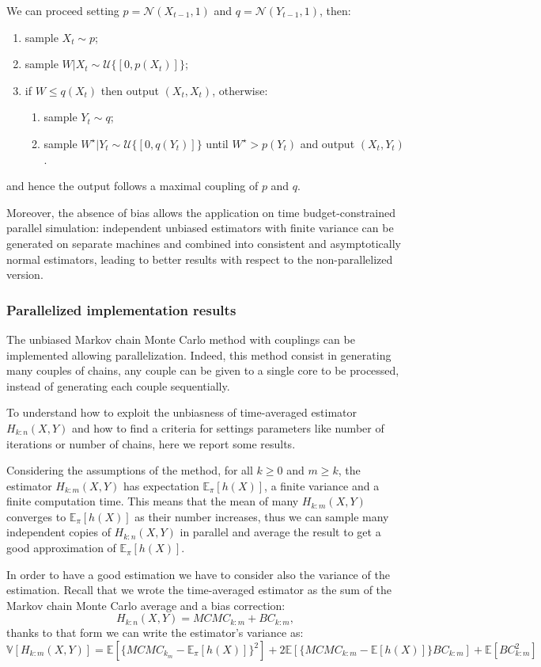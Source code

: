 \documentclass {article}
\begin{document}
We can proceed setting $p = \mathcal{N}(X_{t-1},1)$ and $q = \mathcal{N}(Y_{t-1},1)$, then:
\begin{enumerate}
	\item sample $X_t \sim p$;
	\item sample $W|X_t \sim \mathcal{U}\{[0,p(X_t)]\}$;
	\item if $W\leq q(X_t)$ then output $(X_t,X_t)$, otherwise:
	\begin{enumerate}
		\item sample $Y_t \sim q$;
		\item sample $W^\star | Y_t \sim \mathcal{U}\{[0, q(Y_t)]\}$ 
		until $W^\star > p(Y_t)$ and output $(X_t,Y_t)$.
	\end{enumerate}
\end{enumerate}
and hence the output follows a maximal coupling of $p$ and $q$.

Moreover, the absence of bias allows the application on time budget-constrained parallel simulation: independent unbiased estimators with finite variance can be generated on separate machines and combined into consistent and asymptotically normal estimators, leading to better results with respect to the non-parallelized version.

\subsubsection{Parallelized implementation results}
The unbiased Markov chain Monte Carlo method with couplings can be implemented allowing parallelization. Indeed, this method consist in generating many couples of chains, any couple can be given to a single core to be processed, instead of generating each couple sequentially.

To understand how to exploit the unbiasness of time-averaged estimator $H_{k:n}(X,Y)$ and how to find a criteria for settings parameters like number of iterations or number of chains, here we report some results.

Considering the assumptions of the method, for all $k\geq 0$ and $m \geq k$, the estimator $H_{k:m}(X,Y)$ has expectation $\mathbb{E}_\pi[h(X)]$, a finite variance and a finite computation time. This means that the mean of many $H_{k:m}(X,Y)$ converges to $\mathbb{E}_\pi[h(X)]$ as their number increases, thus we can sample many independent copies of $H_{k:n}(X,Y)$ in parallel and average the result to get a good approximation of $\mathbb{E}_\pi[h(X)]$.

In order to have a good estimation we have to consider also the variance of the estimation. Recall that we wrote the time-averaged estimator as the sum of the Markov chain Monte Carlo average and a bias correction: 
$$ 
H_{k:n}(X,Y) 
= MCMC_{k:m} + BC_{k:m},$$
thanks to that form we can write the estimator's variance as:
$$ 
\mathbb{V}[H_{k:m}(X,Y)] 
= \mathbb{E}[\{MCMC_{k_m} - \mathbb{E}_\pi[h(X)]\}^2] 
+ 2 \mathbb{E}[\{MCMC_{k:m} - \mathbb{E}[h(X)]\}BC_{k:m}] 
+ \mathbb{E}[BC_{k:m}^2] 
$$
\end{document}
